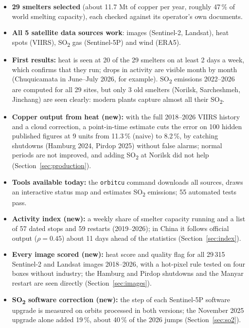\documentclass[10pt,a4paper]{article}
\newcommand{\SOtwo}{SO\textsubscript{2}}
\newcommand{\code}[1]{\texttt{\small #1}}
\begin{document}
\begin{keybox}
\begin{itemize}[leftmargin=1.2em]
  \item \textbf{29 smelters selected} (about 11.7 Mt of copper per year, roughly 47\,\% of world smelting capacity), each checked against its operator's own documents.
  \item \textbf{All 5 satellite data sources work}: images (Sentinel-2, Landsat), heat spots (VIIRS), \SOtwo{} gas (Sentinel-5P) and wind (ERA5).
  \item \textbf{First results:} heat is seen at 20 of the 29 smelters on at least 2 days a week, which confirms that they run; drops in activity are visible month by month (Chuquicamata in June--July 2026, for example). \SOtwo{} emissions 2022--2026 are computed for all 29 sites, but only 3 old smelters (Norilsk, Sarcheshmeh, Jinchang) are seen clearly: modern plants capture almost all their \SOtwo.
  \item \textbf{Copper output from heat (new):} with the full 2018--2026 VIIRS history and a cloud correction, a point-in-time estimate cuts the error on 100 hidden published figures at 9 units from 11.3\,\% (naive) to 8.2\,\%, by catching shutdowns (Hamburg 2024, Pirdop 2025) without false alarms; normal periods are not improved, and adding \SOtwo{} at Norilsk did not help (Section~\ref{sec:production}).
  \item \textbf{Tools available today:} the \code{orbitcu} command downloads all sources, draws an interactive status map and estimates \SOtwo{} emissions; 55 automated tests pass.
  \item \textbf{Activity index (new):} a weekly share of smelter capacity running and a list of 57 dated stops and 59 restarts (2019--2026); in China it follows official output ($\rho=0.45$) about 11 days ahead of the statistics (Section~\ref{sec:index}).
  \item \textbf{Every image scored (new):} heat score and quality flag for all 29\,315 Sentinel-2 and Landsat images 2018--2026, with a hot-pixel rule tested on four boxes without industry; the Hamburg and Pirdop shutdowns and the Manyar restart are seen directly (Section~\ref{sec:images}).
  \item \textbf{\SOtwo{} software correction (new):} the step of each Sentinel-5P software upgrade is measured on orbits processed in both versions; the November 2025 upgrade alone added 19\,\%, about 40\,\% of the 2026 jumps (Section~\ref{sec:so2}).

\end{itemize}
\end{keybox}
\end{document}
